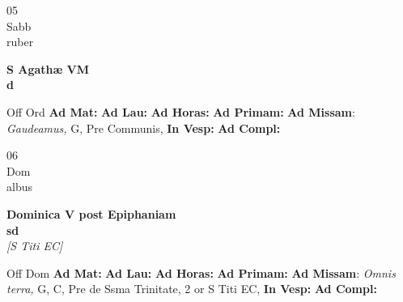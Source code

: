\documentclass[10pt, openany]{book}
\begin{document}
    \begin{center}
        \begin{minipage}{3.5in}
            \vspace{2em}
            \begin{minipage}{0.5in}
                {\Huge 05} \\
                {\normalsize Sabb} \\
                {\normalsize ruber}
            \end{minipage}
            \begin{minipage}{3.0in}
                \textbf{ \large S Agathæ VM \\
                \textnormal{\normalsize d}} \\ 
            \end{minipage}
            \begin{justify}Off Ord
                \textbf{Ad Mat: }
                \textbf{Ad Lau: }
                \textbf{Ad Horas: }
                \textbf{Ad Primam: }\textbf{Ad Missam}: \textit{Gaudeamus,} G, Pre Communis,  
                \textbf{In Vesp: }
                \textbf{Ad Compl: }
            \end{justify}
        \end{minipage}
    \end{center}

    \begin{center}
        \begin{minipage}{3.5in}
            \vspace{2em}
            \begin{minipage}{0.5in}
                {\Huge 06} \\
                {\normalsize Dom} \\
                {\normalsize albus}
            \end{minipage}
            \begin{minipage}{3.0in}
                \textbf{ \large Dominica V post Epiphaniam \\
                \textnormal{\normalsize sd}} \\ \textit{[S Titi EC]} \\ 
            \end{minipage}
            \begin{justify}Off Dom
                \textbf{Ad Mat: }
                \textbf{Ad Lau: }
                \textbf{Ad Horas: }
                \textbf{Ad Primam: }\textbf{Ad Missam}: \textit{Omnis terra,} G, C, Pre de Ssma Trinitate, 2 or S Titi EC,  
                \textbf{In Vesp: }
                \textbf{Ad Compl: }
            \end{justify}
        \end{minipage}
    \end{center}
\end{document}
